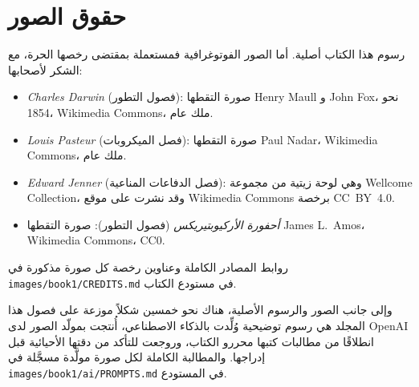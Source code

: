 \chapter*{حقوق الصور}

رسوم هذا الكتاب أصلية. أما الصور الفوتوغرافية فمستعملة بمقتضى رخصها
الحرة، مع الشكر لأصحابها:

\begin{itemize}
  \item \emph{Charles Darwin} (فصول التطور): صورة التقطها
        Henry Maull و John Fox، نحو 1854، Wikimedia Commons،
        ملك عام.
  \item \emph{Louis Pasteur} (فصل الميكروبات): صورة التقطها
        Paul Nadar، Wikimedia Commons، ملك عام.
  \item \emph{Edward Jenner} (فصل الدفاعات المناعية): وهي لوحة
        زيتية من مجموعة Wellcome Collection، وقد نشرت
        على موقع Wikimedia Commons برخصة CC~BY~4.0.
  \item \emph{أحفورة الأركيوبتيريكس} (فصول التطور): صورة التقطها
        James L.~Amos، Wikimedia Commons، CC0.
\end{itemize}

روابط المصادر الكاملة وعناوين رخصة كل صورة مذكورة في
\texttt{images/book1/CREDITS.md} في مستودع الكتاب.

\bigskip
وإلى جانب الصور والرسوم الأصلية، هناك نحو خمسين شكلاً موزعة على فصول
هذا المجلد هي رسوم توضيحية وُلِّدت بالذكاء الاصطناعي، أُنتجت بمولّد الصور
لدى OpenAI انطلاقًا من مطالبات كتبها محررو الكتاب، وروجعت للتأكد من
دقتها الأحيائية قبل إدراجها. والمطالبة الكاملة لكل صورة مولَّدة مسجَّلة في
\texttt{images/book1/ai/PROMPTS.md} في المستودع.
\clearpage
